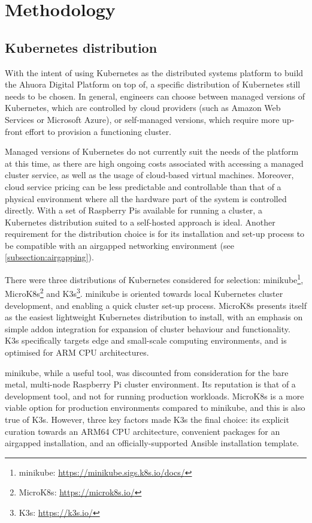 \chapter{Methodology}

\section{Kubernetes distribution}

With the intent of using Kubernetes as the distributed systems platform to build the Ahuora Digital Platform on top of, a specific distribution of Kubernetes still needs to be chosen. In general, engineers can choose between managed versions of Kubernetes, which are controlled by cloud providers (such as Amazon Web Services or Microsoft Azure), or self-managed versions, which require more up-front effort to provision a functioning cluster.

Managed versions of Kubernetes do not currently suit the needs of the platform at this time, as there are high ongoing costs associated with accessing a managed cluster service, as well as the usage of cloud-based virtual machines. Moreover, cloud service pricing can be less predictable and controllable than that of a physical environment where all the hardware part of the system is controlled directly. With a set of Raspberry Pis available for running a cluster, a Kubernetes distribution suited to a self-hosted approach is ideal. Another requirement for the distribution choice is for its installation and set-up process to be compatible with an airgapped networking environment (see \ref{subsection:airgapping}).

There were three distributions of Kubernetes considered for selection: minikube\footnote{minikube: \url{https://minikube.sigs.k8s.io/docs/}}, MicroK8s\footnote{MicroK8s: \url{https://microk8s.io/}} and K3s\footnote{K3s: \url{https://k3s.io/}}. minikube is oriented towards local Kubernetes cluster development, and enabling a quick cluster set-up process. MicroK8s presents itself as the easiest lightweight Kubernetes distribution to install, with an emphasis on simple addon integration for expansion of cluster behaviour and functionality. K3s specifically targets edge and small-scale computing environments, and is optimised for ARM CPU architectures.

minikube, while a useful tool, was discounted from consideration for the bare metal, multi-node Raspberry Pi cluster environment. Its reputation is that of a development tool, and not for running production workloads. MicroK8s is a more viable option for production environments compared to minikube, and this is also true of K3s. However, three key factors made K3s the final choice: its explicit curation towards an ARM64 CPU architecture, convenient packages for an airgapped installation, and an officially-supported Ansible installation template.


